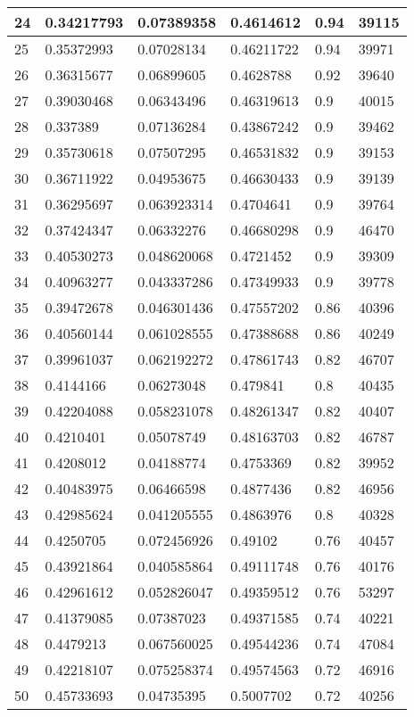 \begin{longtable}{|l|l|l|l|l|l|}
24 & 0.34217793 & 0.07389358 & 0.4614612 & 0.94 & 39115 \\ \hline 
25 & 0.35372993 & 0.07028134 & 0.46211722 & 0.94 & 39971 \\ \hline 
26 & 0.36315677 & 0.06899605 & 0.4628788 & 0.92 & 39640 \\ \hline 
27 & 0.39030468 & 0.06343496 & 0.46319613 & 0.9 & 40015 \\ \hline 
28 & 0.337389 & 0.07136284 & 0.43867242 & 0.9 & 39462 \\ \hline 
29 & 0.35730618 & 0.07507295 & 0.46531832 & 0.9 & 39153 \\ \hline 
30 & 0.36711922 & 0.04953675 & 0.46630433 & 0.9 & 39139 \\ \hline 
31 & 0.36295697 & 0.063923314 & 0.4704641 & 0.9 & 39764 \\ \hline 
32 & 0.37424347 & 0.06332276 & 0.46680298 & 0.9 & 46470 \\ \hline 
33 & 0.40530273 & 0.048620068 & 0.4721452 & 0.9 & 39309 \\ \hline 
34 & 0.40963277 & 0.043337286 & 0.47349933 & 0.9 & 39778 \\ \hline 
35 & 0.39472678 & 0.046301436 & 0.47557202 & 0.86 & 40396 \\ \hline 
36 & 0.40560144 & 0.061028555 & 0.47388688 & 0.86 & 40249 \\ \hline 
37 & 0.39961037 & 0.062192272 & 0.47861743 & 0.82 & 46707 \\ \hline 
38 & 0.4144166 & 0.06273048 & 0.479841 & 0.8 & 40435 \\ \hline 
39 & 0.42204088 & 0.058231078 & 0.48261347 & 0.82 & 40407 \\ \hline 
40 & 0.4210401 & 0.05078749 & 0.48163703 & 0.82 & 46787 \\ \hline 
41 & 0.4208012 & 0.04188774 & 0.4753369 & 0.82 & 39952 \\ \hline 
42 & 0.40483975 & 0.06466598 & 0.4877436 & 0.82 & 46956 \\ \hline 
43 & 0.42985624 & 0.041205555 & 0.4863976 & 0.8 & 40328 \\ \hline 
44 & 0.4250705 & 0.072456926 & 0.49102 & 0.76 & 40457 \\ \hline 
45 & 0.43921864 & 0.040585864 & 0.49111748 & 0.76 & 40176 \\ \hline 
46 & 0.42961612 & 0.052826047 & 0.49359512 & 0.76 & 53297 \\ \hline 
47 & 0.41379085 & 0.07387023 & 0.49371585 & 0.74 & 40221 \\ \hline 
48 & 0.4479213 & 0.067560025 & 0.49544236 & 0.74 & 47084 \\ \hline 
49 & 0.42218107 & 0.075258374 & 0.49574563 & 0.72 & 46916 \\ \hline 
50 & 0.45733693 & 0.04735395 & 0.5007702 & 0.72 & 40256 \\ \hline 
\end{longtable}